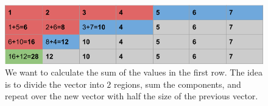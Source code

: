\begin{figure}[h]
\includegraphics[width=\linewidth]{Figures/example_gpu_reduction.png}
\caption[Application of sum reduction]{We want to calculate the sum of the values in the first row. The idea is to divide the vector into $2$ regions, sum the components, and repeat over the new vector with half the size of the previous vector.}
\label{fig:gpu_reduction}
\end{figure}
